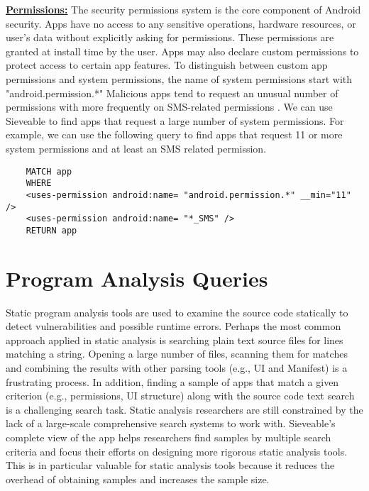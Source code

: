 \underline{\textbf{Permissions:}}
The security permissions system is the core component of Android security.
Apps have no access to any sensitive operations, hardware resources, or user's data without explicitly asking for permissions. These permissions are granted at install time by the user.
Apps may also declare custom permissions to protect access to certain app features.
To distinguish between custom app permissions and system permissions, the name of system permissions start with "android.permission.*"
Malicious apps tend to request an unusual number of permissions with more frequently on SMS-related permissions \cite{zhou_2012_SP_dissecting}.
We can use Sieveable to find apps that request a large number of system permissions.
For example, we can use the following query to find apps that request 11 or more system permissions and at least an SMS related permission.

\begin{verbatim}
	MATCH app
	WHERE
	<uses-permission android:name= "android.permission.*" __min="11" />
	<uses-permission android:name= "*_SMS" />
	RETURN app
\end{verbatim}

\section{Program Analysis Queries}
Static program analysis tools are used to examine the source code statically to detect vulnerabilities and possible runtime errors.
Perhaps the most common approach applied in static analysis is searching plain text source files for lines matching a string.
Opening a large number of files, scanning them for matches and combining the results with other parsing tools (e.g., UI and Manifest) is a frustrating process. 
In addition, finding a sample of apps that match a given criterion (e.g., permissions, UI structure) along with the source code text search is a challenging search task.
Static analysis researchers are still constrained by the lack of a large-scale comprehensive search systems to work with.
Sieveable's complete view of the app helps researchers find samples by multiple search criteria and focus their efforts on designing more rigorous static analysis tools.
This is in particular valuable for static analysis tools because it reduces the overhead of obtaining samples and increases the sample size.

